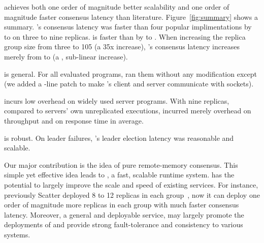 \begin{tightenum}
\item \xxx achieves both one order of magnitude better scalability and one 
order of magnitude faster consensus latency than literature. 
Figure~\ref{fig:summary} shows a summary. \xxx's consensus latency was faster 
than four popular \paxos implimentations by \comptradlow to \comptradhigh on 
three to nine replicas. \xxx is faster than \dare by \fasterDARElow to 
\fasterDARE. When increasing the replica group size from three to 105 (a 35x 
increase), \xxx's consensus latency increases merely from \xxxlatencythree to 
\xxxlatencyonezerofive (a \xxxscalability, sub-linear increase).

\item \xxx is general. For all \nprog evaluated programs, \xxx ran them without 
any modification except \calvin (we added a \nlinescalvin-line patch to make 
\calvin's client and server communicate with sockets).

\item \xxx incurs low overhead on \nprog widely used server programs. 
With nine replicas, compared to servers' own unreplicated executions, \xxx 
incurred merely \tputoverhead overhead on throughput and \latencyoverhead on 
response time in average.

\item \xxx is robust. On \paxos leader failures, \xxx's leader election 
latency was reasonable and scalable.







\end{tightenum}  

Our major contribution is the idea of pure remote-memory consensus. This simple 
yet effective idea leads to \xxx, a fast, scalable \paxos runtime system. \xxx 
has the potential to largely improve the scale and speed of existing \paxos 
services. For instance, previously Scatter deployed 8 to 12 replicas in each 
\paxos group~\cite{scatter:sosp11}, now it can deploy one order of magnitude 
more replicas in each group with much faster consensus latency. Moreover, a 
general and deployable service, \xxx may largely promote the deployments of 
\paxos and provide strong fault-tolerance and consistency to various 
systems.

